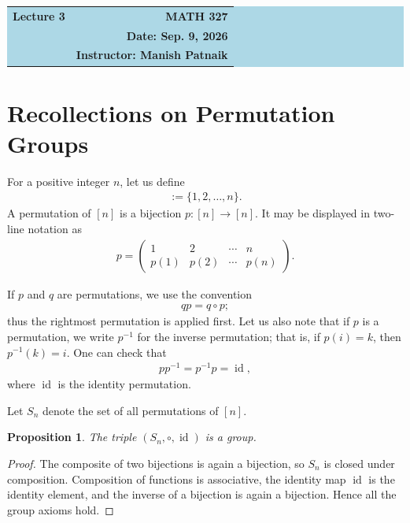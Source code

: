 \documentclass[reqno,11pt]{amsart}
\theoremstyle{definition}
\theoremstyle{plain}
\newtheorem{proposition}{Proposition}[section]
\theoremstyle{remark}
\numberwithin{equation}{section}
\newcommand{\id}{\operatorname{id}}
\newcommand{\be}{\begin{eqnarray}}
\newcommand{\ee}{\end{eqnarray}}
\begin{document}
\begin{center}
  \colorbox{lightblue}{%
    \begin{minipage}{0.94\textwidth}
      \vspace{0.55em}
      \begin{tabular*}{\textwidth}{@{\extracolsep{\fill}}lr}
        {\color{courseblue}\bfseries\LARGE Lecture 3} &
        {\color{courseblue}\bfseries\LARGE MATH 327}\\[0.35em]
         & \textbf{Date: Sep. 9, 2026}\\
        & \textbf{Instructor: Manish Patnaik}
      \end{tabular*}
      \vspace{0.45em}
    \end{minipage}}
\end{center}

\par

\setcounter{tocdepth}{1}
\tableofcontents

\section{Recollections on Permutation Groups}
 
 For a positive integer $n$, let us define
\be
[n]:=\{1,2,\ldots,n\}.
\ee
A permutation of $[n]$ is a bijection $p\colon[n]\to[n]$. It may be displayed
in two-line notation as
\be
p=
\begin{pmatrix}
1&2&\cdots&n\\
p(1)&p(2)&\cdots&p(n)
\end{pmatrix}.
\ee

If $p$ and $q$ are permutations, we use the convention
\be
qp=q\circ p;
\ee
thus the rightmost permutation is applied first. Let us also note that if $p$
is a permutation, we write $p^{-1}$ for the inverse permutation; that is, if
$p(i)=k$, then $p^{-1}(k)=i$. One can check that
\be
pp^{-1}=p^{-1}p=\id,
\ee
where $\id$ is the identity permutation.

Let $S_n$ denote the set of all permutations of $[n]$.

\begin{proposition}
	The triple $(S_n,\circ,\id)$ is a group.
\end{proposition}

\begin{proof}
	The composite of two bijections is again a bijection, so $S_n$ is closed
	under composition. Composition of functions is associative, the identity
	map $\id$ is the identity element, and the inverse of a bijection is again a
	bijection. Hence all the group axioms hold.
\end{proof}
\end{document}
